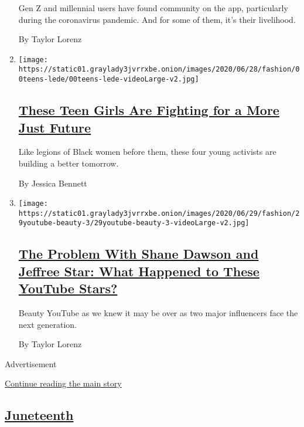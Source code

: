 \begin{enumerate}
  Gen Z and millennial users have found community on the app,
  particularly during the coronavirus pandemic. And for some of them,
  it's their livelihood.

  By Taylor Lorenz
\item
  \texttt{[image: https://static01.graylady3jvrrxbe.onion/images/2020/06/28/fashion/00teens-lede/00teens-lede-videoLarge-v2.jpg]}

  \hypertarget{these-teen-girls-are-fighting-for-a-more-just-future}{%
  \subsection{\texorpdfstring{\href{/2020/06/26/style/teen-girls-black-lives-matter-activism.html}{These
  Teen Girls Are Fighting for a More Just
  Future}}{These Teen Girls Are Fighting for a More Just Future}}\label{these-teen-girls-are-fighting-for-a-more-just-future}}

  Like legions of Black women before them, these four young activists
  are building a better tomorrow.

  By Jessica Bennett
\item
  \texttt{[image: https://static01.graylady3jvrrxbe.onion/images/2020/06/29/fashion/29youtube-beauty-3/29youtube-beauty-3-videoLarge-v2.jpg]}

  \hypertarget{the-problem-with-shane-dawson-and-jeffree-star-what-happened-to-these-youtube-stars}{%
  \subsection{\texorpdfstring{\href{/2020/06/29/style/shane-dawson-jeffree-star-youtube-taylor-lorenz.html}{The
  Problem With Shane Dawson and Jeffree Star: What Happened to These
  YouTube
  Stars?}}{The Problem With Shane Dawson and Jeffree Star: What Happened to These YouTube Stars?}}\label{the-problem-with-shane-dawson-and-jeffree-star-what-happened-to-these-youtube-stars}}

  Beauty YouTube as we knew it may be over as two major influencers face
  the next generation.

  By Taylor Lorenz
\end{enumerate}

Advertisement

\protect\hyperlink{after-mid1}{Continue reading the main story}

\hypertarget{juneteenth}{%
\subsection{\texorpdfstring{\href{/issue/style/2020/06/18/juneteenth}{Juneteenth}}{Juneteenth}}\label{juneteenth}}

